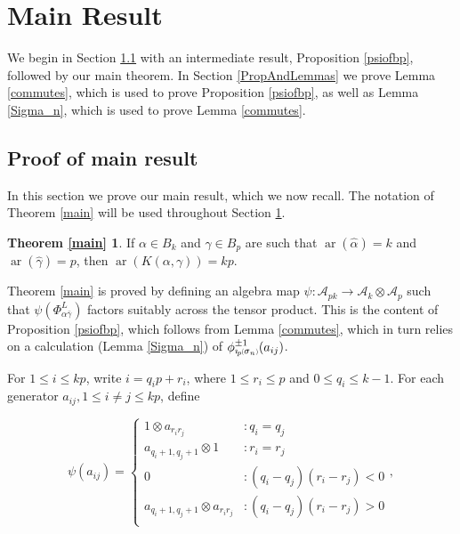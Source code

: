 \documentclass[11pt]{amsart}
\def\ltblue{blue!20!white}
\def\A{{\mathcal A}}
\def\s{{\sigma}}
\def\ar{\operatorname{ar}}
\newcommand*{\subsmallp}[1]{\scalebox{.5}{\ensuremath#1}}
\newcommand{\subpp}[2][p]{\imath_{\hspace*{-1pt}#1}\hspace*{-.5pt}\subsmallp(#2\subsmallp)}
\theoremstyle{definition}
\begin{document}
\section{Main Result}
\label{SecMain}
\todo[inline, color=\ltblue]{proof of Corollary 1.3}

We begin in Section \ref{MainProof} with an intermediate result, Proposition \ref{psiofbp}, followed by our main theorem.  In Section \ref{PropAndLemmas} we prove Lemma \ref{commutes}, which is used to prove Proposition \ref{psiofbp}, as well as Lemma \ref{Sigma_n}, which is used to prove Lemma \ref{commutes}.

\subsection{Proof of main result}
\label{MainProof}
In this section we prove our main result, which we now recall. The notation of Theorem \ref{main} will be used throughout Section \ref{SecMain}.

\newtheorem*{main}{Theorem \ref{main}}
\begin{main}
If $\alpha\in B_k$ and $\gamma\in B_p$ are such that $\ar(\hat{\alpha})=k$ and $\ar(\hat{\gamma})=p$, then $\ar(K(\alpha,\gamma))=kp$.
\end{main}

Theorem \ref{main} is proved by defining an algebra map $\psi\colon \A_{pk} \rightarrow \A_k\otimes \A_p$ such that $\psi(\Phi_{\alpha\bar\gamma}^L)$ factors suitably across the tensor product. This is the content of Proposition \ref{psiofbp}, which follows from Lemma \ref{commutes}, which in turn relies on a calculation (Lemma \ref{Sigma_n}) of $\phi_{\subpp{\s_n}}^{\pm 1}(a_{ij})$.

For $1\le i\le kp$, write $i = q_ip + r_i$, where $1\le r_i \le p$ and $0\le q_i\le k-1$.  For each generator $a_{ij}, 1\le i\ne j\le kp$, define

\begin{equation}
\psi(a_{ij}) =
  \begin{cases}
         1\otimes a_{r_ir_j} & \colon q_i = q_j\\
         a_{q_i+1,q_j+1}\otimes 1 & \colon r_i = r_j\\
         0 & \colon (q_i-q_j)(r_i-r_j)<0\\
         a_{q_i+1,q_j+1}\otimes a_{r_ir_j} & \colon (q_i-q_j)(r_i-r_j)>0\\
  \end{cases},
  \label{defn:psi}
\end{equation}
\end{document}
